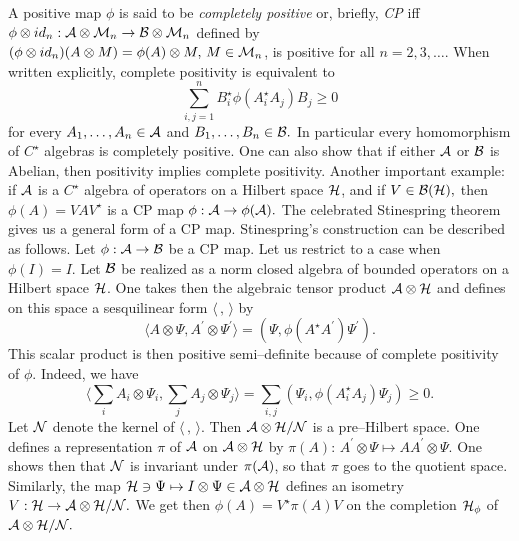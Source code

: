 \documentclass[12pt]{article}
\def\be{\begin{equation}} \def\ee{\end{equation}}
\begin{document}
A positive map $
\phi$ is said to be {\sl completely positive} or,  briefly,   {\sl CP}
 iff $\phi \otimes id_n
: {\cal A }\otimes {\cal M}_n \rightarrow {\cal B}\otimes {\cal M}_n $ defined
by $  (\phi\otimes id_n)  (A\otimes M ) = \phi  (A)\otimes M , \,  M\in {\cal M}_n
$, is positive for all $n=2, 3, \ldots . $ When written explicitly,  complete
positivity is equivalent to \be \sum_{i, j=1}^n B_i^{\star}\phi
 (A_i^{\star}A_j)B_j \geq 0 \ee for every $A_1, \ldots , A_n \in {\cal A}$ and
$B_1, \ldots , B_n \in {\cal B} . $ In particular every homomorphism of 
$C^{\star}$ algebras is completely positive.  One can also show that if either 
${\cal A}$ or ${\cal B}$ is Abelian,  then positivity implies complete
positivity.  Another important example:  if ${\cal A}$ is a $C^{\star }$ 
algebra of
operators on a Hilbert space ${\cal H}$,  and if $V\in {\cal B} ({\cal H}) , $
then $\phi  (A) = VAV^{\star}$ is a CP map $\phi :  {\cal A}
\rightarrow \phi ({\cal A}) . $ The celebrated Stinespring theorem gives us a
general form of a CP map.  Stinespring's construction can be
described as follows.  Let $\phi :  {\cal A}\rightarrow {\cal B}$ be a
CP map.  Let us restrict to a case when $\phi  (I)=I . $ 
Let ${\cal B}$ be
realized as a norm closed algebra of bounded operators on a Hilbert space 
${\cal H}$.  One takes then the algebraic tensor product ${\cal A}\otimes 
{\cal H}$ and defines on this space a sesquilinear form $ \langle\,  , \,  \rangle$ by 
\be \langle A\otimes \Psi ,  A^{\prime}\otimes
\Psi^{\prime}\rangle= (\Psi ,  \phi  (A^{\star}A^{\prime} ) \Psi^{\prime}) .  \ee
This scalar product is then positive semi--definite because of complete
positivity of $\phi . $ Indeed,  we have \be \langle \sum_i A_i\otimes\Psi_i ,  \sum_j
A_j\otimes\Psi_j \rangle = \sum_{i, j}  (\Psi_i, \phi  (A_i^{\star } A_j ) \Psi_j )
\geq 0 .  \ee  Let ${\cal N}$ denote the kernel of $ \langle\,  , \,  \rangle$.  
Then ${\cal A}\otimes {\cal H} / {\cal N} $ is a
pre--Hilbert space.  One defines a representation $\pi$ of ${\cal A}$ on 
${\cal A}\otimes {\cal H}$ by $\pi  (A) : \,  A^{\prime}\otimes\Psi\longmapsto
AA^{\prime}\otimes\Psi . $ One shows then that ${\cal N}$ is invariant under $
\pi  ({\cal A})$,  so that $\pi $ goes to the quotient space.  Similarly,  the
map ${\cal H}\ni\Psi \mapsto I\otimes \Psi \in {\cal A}\otimes{\cal H}$ 
defines an isometry $V :  {\cal H}
\rightarrow {\cal A}\otimes {\cal H} / {\cal N} . $ We get then $
\phi  (A) = V^{\star}\pi  (A) V $ on the completion ${\cal H}_{\phi } $ of $
{\cal A}\otimes {\cal H} / {\cal N} . $ \vspace{0.5cm}
\end{document}
